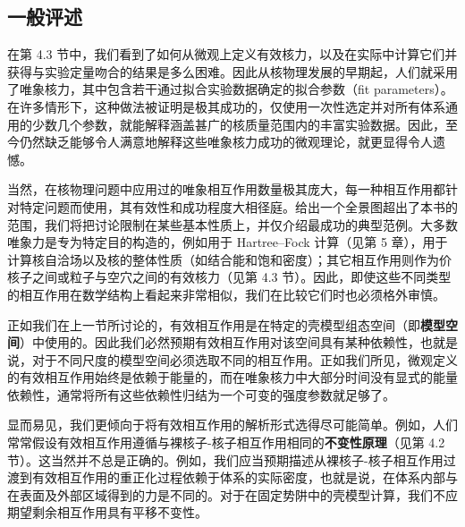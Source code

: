 \subsection{一般评述}

在第 4.3 节中，我们看到了如何从微观上定义有效核力，以及在实际中计算它们并获得与实验定量吻合的结果是多么困难。因此从核物理发展的早期起，人们就采用了唯象核力，其中包含若干通过拟合实验数据确定的拟合参数（fit
parameters）。在许多情形下，这种做法被证明是极其成功的，仅使用一次性选定并对所有体系通用的少数几个参数，就能解释涵盖甚广的核质量范围内的丰富实验数据。因此，至今仍然缺乏能够令人满意地解释这些唯象核力成功的微观理论，就更显得令人遗憾。

当然，在核物理问题中应用过的唯象相互作用数量极其庞大，每一种相互作用都针对特定问题而使用，其有效性和成功程度大相径庭。给出一个全景图超出了本书的范围，我们将把讨论限制在某些基本性质上，并仅介绍最成功的典型范例。大多数唯象力是专为特定目的构造的，例如用于
Hartree–Fock 计算（见第 5 章），用于计算核自洽场以及核的整体性质（如结合能和饱和密度）；其它相互作用则作为价核子之间或粒子与空穴之间的有效核力（见第
4.3 节）。因此，即使这些不同类型的相互作用在数学结构上看起来非常相似，我们在比较它们时也必须格外审慎。

正如我们在上一节所讨论的，有效相互作用是在特定的壳模型组态空间（即\textbf{模型空间}）中使用的。因此我们必然预期有效相互作用对该空间具有某种依赖性，也就是说，对于不同尺度的模型空间必须选取不同的相互作用。正如我们所见，微观定义的有效相互作用始终是依赖于能量的，而在唯象核力中大部分时间没有显式的能量依赖性，通常将所有这些依赖性归结为一个可变的强度参数就足够了。

显而易见，我们更倾向于将有效相互作用的解析形式选得尽可能简单。例如，人们常常假设有效相互作用遵循与裸核子-核子相互作用相同的\textbf{不变性原理}（见第
4.2 节）。这当然并不总是正确的。例如，我们应当预期描述从裸核子-核子相互作用过渡到有效相互作用的重正化过程依赖于体系的实际密度，也就是说，在体系内部与在表面及外部区域得到的力是不同的。对于在固定势阱中的壳模型计算，我们不应期望剩余相互作用具有平移不变性。

